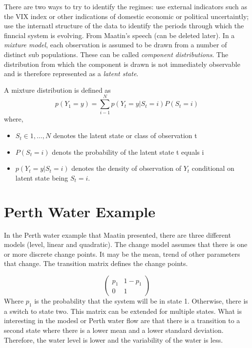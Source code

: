 \documentclass[12pt, a4paper, oneside]{article} %
\begin{document}
There are two ways to try to identify the regimes: use external indicators such as the VIX index or other indications of domestic economic or political uncertaintly; use the internatl structure of the data to identify the periods through which the finncial system  is evolving. 
From Maatin's speech (can be deleted later).  In a \emph{mixture model}, each observation is assumed to be drawn from a number of distinct sub populations.  These can be called \emph{component distributions}.  The distribution from which the component is drawn is not immediately observable and is therefore represented as a \emph{latent state}. 

A mixture distribution is defined as 
\begin{equation}
p(Y_1 = y) = \sum_{i - 1}^N p(Y_t = y|S_t = i)P(S_t = i)
\end{equation}
where,
\begin{itemize}
\item $S_t \in {1, \dots, N}$ denotes the latent state or class of observation t
\item $P(S_t = i)$ denots the probability of the latent state t equals i 
\item $p(Y_t = y|S_t = i)$ denotes the density of observation of $Y_t$ conditional on latent state being $S_t = i$.
\end{itemize}
\section{Perth Water Example}

In the Perth water example that Maatin presented, there are three different models (level, linear and quadratic).  The change model assumes that there is one or more discrete change points.  It may be the mean, trend of other parameters that change. The transition matrix defines the change points.  

\begin{equation*}
\begin{pmatrix}
p_1 & 1 - p_1 \\
0 & 1
\end{pmatrix}
\end{equation*}
Where $p_1$ is the probability that the system will be in state 1.  Otherwise, there is a switch to state two.  This matrix can be extended for multiple states. What is interesting in the modesl or Perth water flow are that there is a transition to a second state where there is a lower mean and a lower standard deviation. Therefore, the water level is lower and the variability of the water is less. 
\end{document}

